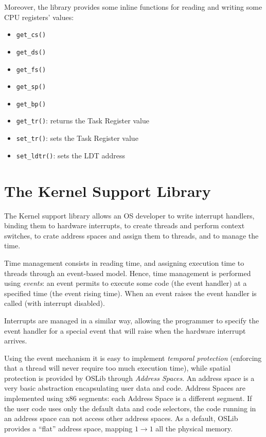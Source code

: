 \documentclass[a4paper]{report}
\begin{document}
Moreover, the library provides some inline functions for reading and
writing some CPU registers' values:
\begin{itemize}
	\item {\tt get\_cs()}
	\item {\tt get\_ds()}
	\item {\tt get\_fs()}
	\item {\tt get\_sp()}
	\item {\tt get\_bp()}
	\item {\tt get\_tr()}: returns the Task Register value
	\item {\tt set\_tr()}: sets the Task Register value
	\item {\tt set\_ldtr()}: sets the LDT address
\end{itemize}

\section{The Kernel Support Library}
The Kernel support library allows an OS developer to write interrupt
handlers, binding them to hardware interrupts, to create threads and
perform context switches, to crate address spaces and assign them to
threads, and to manage the time.

Time management consists in reading time, and assigning execution
time to threads through an event-based model. Hence, time management
is performed using {\em events}: an event permits to execute some code
(the event handler) at a specified time (the event rising time).
When an event raises the event handler is called (with interrupt disabled).

Interrupts are managed in a similar way, allowing the programmer to
specify the event handler for a special event that will raise when the
hardware interrupt arrives.

Using the event mechanism it is easy to implement {\em temporal protection}
(enforcing that a thread will never require too much execution time), while
spatial protection is provided by OSLib through {\em Address Spaces}. An
address space is a very basic abstraction encapsulating user data and code.
Address Spaces are implemented using x86 segments: each Address Space is a
different segment. If the user code uses only the default data and code
selectors, the code running in an address space can not access other address
spaces. As a default, OSLib provides a ``flat'' address space, mapping
$1 \rightarrow 1$ all the physical memory.
\end{document}
